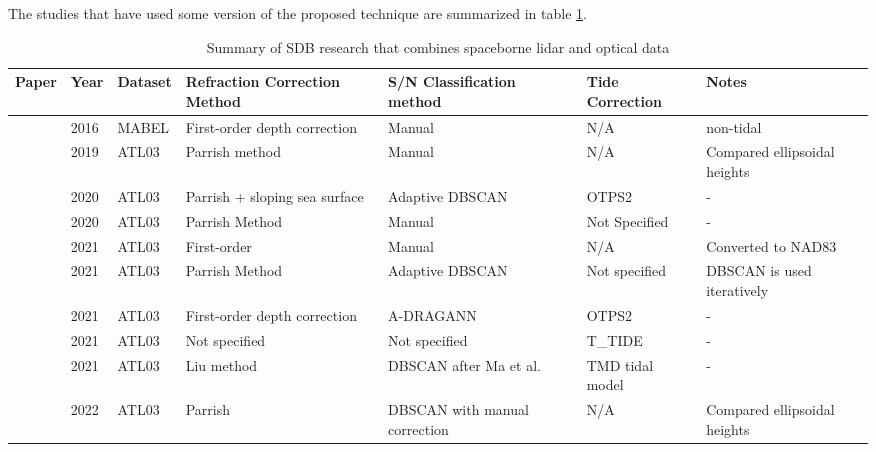 The studies that have used some version of the proposed technique are summarized in table \ref{tab:researchsummary}.

\begin{landscape}
      \begin{table}
            \caption{Summary of SDB research that combines spaceborne lidar and optical data}
            \label{tab:researchsummary}
            \raggedright
            \begin{tabular}{p{3.7cm}llp{3.2cm}p{3.5cm}ll}
                  \midrule
                  Paper                              & Year & Dataset & Refraction Correction Method  & S/N Classification method     & Tide Correction & Notes                        \\
                  \hline
                  \citeauthor{Forfinski-Sarkozi2016} & 2016 & MABEL   & First-order depth correction  & Manual                        & N/A             & non-tidal                    \\
                  \citeauthor{Parrish2019}           & 2019 & ATL03   & Parrish method                & Manual                        & N/A             & Compared ellipsoidal heights \\
                  \citeauthor{Ma2020}                & 2020 & ATL03   & Parrish + sloping sea surface & Adaptive DBSCAN               & OTPS2           & -                            \\
                  \citeauthor{Thomas2021d}           & 2020 & ATL03   & Parrish Method                & Manual                        & Not Specified   & -                            \\
                  \citeauthor{Albright2021}          & 2021 & ATL03   & First-order                   & Manual                        & N/A             & Converted to NAD83           \\
                  \citeauthor{Xie2021}               & 2021 & ATL03   & Parrish Method                & Adaptive DBSCAN               & Not specified   & DBSCAN is used iteratively   \\
                  \citeauthor{Cao2021}               & 2021 & ATL03   & First-order depth correction  & A-DRAGANN                     & OTPS2           & -                            \\
                  \citeauthor{Lee2021}               & 2021 & ATL03   & Not specified                 & Not specified                 & T\_TIDE         & -                            \\
                  \citeauthor{Liu2021}               & 2021 & ATL03   & Liu method                    & DBSCAN after Ma et al.        & TMD tidal model & -                            \\
                  \citeauthor{LeQuilleuc2022b}       & 2022 & ATL03   & Parrish                       & DBSCAN with manual correction & N/A             & Compared ellipsoidal heights \\
                  \bottomrule
            \end{tabular}
      \end{table}

\end{landscape}
\restoregeometry
